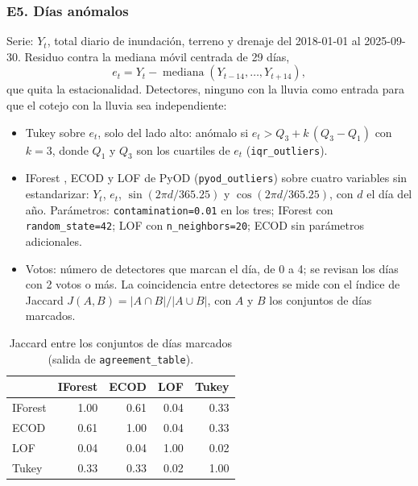 \documentclass[11pt]{article}
\newcommand{\cod}[1]{\nolinkurl{#1}}
\begin{document}
\FloatBarrier
\subsubsection*{E5. Días anómalos}

Serie: $Y_t$, total diario de inundación, terreno y drenaje del 2018-01-01 al 2025-09-30. Residuo contra la mediana móvil centrada de 29 días,
\[ e_t=Y_t-\operatorname{mediana}(Y_{t-14},\dots,Y_{t+14}), \]
que quita la estacionalidad. Detectores, ninguno con la lluvia como entrada para que el cotejo con la lluvia sea independiente:

\begin{itemize}
  \item Tukey sobre $e_t$, solo del lado alto: anómalo si $e_t>Q_3+k\,(Q_3-Q_1)$ con $k=3$, donde $Q_1$ y $Q_3$ son los cuartiles de $e_t$ (\cod{iqr_outliers}).
  \item IForest \cite{liu2008}, ECOD \cite{li2022} y LOF \cite{breunig2000} de PyOD \cite{zhao2019} (\cod{pyod_outliers}) sobre cuatro variables sin estandarizar: $Y_t$, $e_t$, $\sin(2\pi d/365.25)$ y $\cos(2\pi d/365.25)$, con $d$ el día del año. Parámetros: \cod{contamination=0.01} en los tres; IForest con \cod{random_state=42}; LOF con \cod{n_neighbors=20}; ECOD sin parámetros adicionales.
  \item Votos: número de detectores que marcan el día, de 0 a 4; se revisan los días con 2 votos o más. La coincidencia entre detectores se mide con el índice de Jaccard $J(A,B)=|A\cap B|/|A\cup B|$, con $A$ y $B$ los conjuntos de días marcados.
\end{itemize}

\begin{table}[!htbp]
  \centering
  \small
  \caption{Jaccard entre los conjuntos de días marcados (salida de \cod{agreement_table}).}
  \label{tab:e5-jaccard}
  \begin{tabular}{lrrrr}
    \toprule
     & IForest & ECOD & LOF & Tukey \\
    \midrule
    IForest & 1.00 & 0.61 & 0.04 & 0.33 \\
    ECOD & 0.61 & 1.00 & 0.04 & 0.33 \\
    LOF & 0.04 & 0.04 & 1.00 & 0.02 \\
    Tukey & 0.33 & 0.33 & 0.02 & 1.00 \\
    \bottomrule
  \end{tabular}
\end{table}
\end{document}
